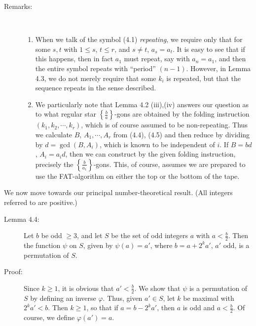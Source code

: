 \begin{description}
  \item[Remarks:] $\ $
    \begin{enumerate}[\hspace{1cm}(i)]
      \item When we talk of the symbol (4.1) \emph{repeating}, we require only that for some $s,t$ with $1 \leq s$, $t \leq r$, and $s \neq t$, $a_{s} = a_{t}$. It is easy to see that if this happens, then in fact $a_{1}$ must repeat, say with $a_{n} = a_{1}$, and then the entire symbol repeats with ``period'' $(n-1)$. However, in Lemma 4.3, we do not merely require that some $k_{i}$ is repeated, but that the sequence repeats in the sense described.
      \item We particularly note that Lemma 4.2 (iii),(iv) answers our question as to what regular star $\left\{ \frac{b}{a} \right\}$-gons are obtained by the folding instruction $(k_{1}, k_{2}, \cdots, k_{r})$, which is of course assumed to be non-repeating. Thus we calculate $B$, $A_{1}, \cdots, A_{r}$ from (4.4), (4.5) and then reduce by dividing by $d = \gcd(B,A_{i})$, which is known to be independent of $i$. If $B = bd$, $A_{i} = a_{i} d$, then we can construct by the given folding instruction, precisely the $\left\{ \frac{b}{a_{1}} \right\}$-gons. This, of course, assumes we are prepared to use the FAT-algorithm on either the top or the bottom of the tape.
    \end{enumerate}

\end{description}

We now move towards our principal number-theoretical result. (All integers referred to are positive.)

\begin{description}

  \item[Lemma 4.4:] Let $b$ be odd $\geq 3$, and let $S$ be the set of odd integers $a$ with $a < \frac{b}{2}$. Then the function $\psi$ on $S$, given by $\psi(a) = a'$, where $b = a + 2^{k} a'$, $a'$ odd, is a permutation of $S$.

  \item[Proof:] Since $k \geq 1$, it is obvious that $a' < \frac{b}{2}$. We show that $\psi$ is a permutation of $S$ by defining an inverse $\varphi$. Thus, given $a' \in S$, let $k$ be maximal with $2^{k} a' < b$. Then $k \geq 1$, so that if $a = b - 2^{k} a'$, then $a$ is odd and $a < \frac{b}{2}$. Of course, we define $\varphi(a') = a$.

\end{description}

